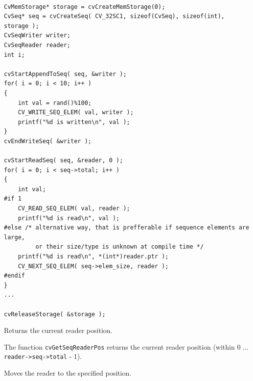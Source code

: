 \begin{lstlisting}

CvMemStorage* storage = cvCreateMemStorage(0);
CvSeq* seq = cvCreateSeq( CV_32SC1, sizeof(CvSeq), sizeof(int), storage );
CvSeqWriter writer;
CvSeqReader reader;
int i;

cvStartAppendToSeq( seq, &writer );
for( i = 0; i < 10; i++ )
{
    int val = rand()%100;
    CV_WRITE_SEQ_ELEM( val, writer );
    printf("%d is written\n", val );
}
cvEndWriteSeq( &writer );

cvStartReadSeq( seq, &reader, 0 );
for( i = 0; i < seq->total; i++ )
{
    int val;
#if 1
    CV_READ_SEQ_ELEM( val, reader );
    printf("%d is read\n", val );
#else /* alternative way, that is prefferable if sequence elements are large,
         or their size/type is unknown at compile time */
    printf("%d is read\n", *(int*)reader.ptr );
    CV_NEXT_SEQ_ELEM( seq->elem_size, reader );
#endif
}
...

cvReleaseStorage( &storage );

\end{lstlisting}

\label{GetSeqReaderPos}

Returns the current reader position.


\begin{description}
\end{description}


The function \texttt{cvGetSeqReaderPos} returns the current reader position (within 0 ... \texttt{reader->seq->total} - 1).

\label{SetSeqReaderPos}

Moves the reader to the specified position.


\begin{description}
\end{description}

